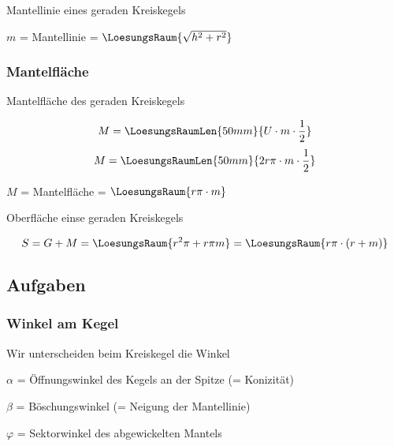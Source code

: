 \begin{gesetz}{Mantellinie eines geraden Kreiskegels}{}

  $m$ = Mantellinie = $\LoesungsRaum{\sqrt{h^2 + r^2}}$
  
\end{gesetz}



\newpage
\subsubsection{Mantelfläche}



\begin{gesetz}{Mantelfläche des geraden Kreiskegels}{}
  
$$M = \LoesungsRaumLen{50mm}{U\cdot{}m\cdot{}\frac12}$$
$$M = \LoesungsRaumLen{50mm}{2r\pi\cdot{} m\cdot{}\frac12}$$

$M$ = Mantelfläche = $\LoesungsRaum{r\pi\cdot{}m}$

\end{gesetz}

\noTRAINER{\vspace{20mm}}



\begin{gesetz}{Oberfläche einse geraden Kreiskegels}{}

  $$S = G + M = \LoesungsRaum{r^2\pi + r\pi m} = \LoesungsRaum{r\pi\cdot{}(r+m)}$$
\end{gesetz}


\newpage
\subsection*{Aufgaben}
\newpage

\subsubsection{Winkel am Kegel}
\begin{bemerkung}{}{}
  Wir unterscheiden beim Kreiskegel die Winkel

  $\alpha$ = Öffnungswinkel des Kegels an der Spitze (= Konizität)

  $\beta$ = Böschungswinkel (= Neigung der Mantellinie)

  $\varphi$ = Sektorwinkel des abgewickelten Mantels
\end{bemerkung}

